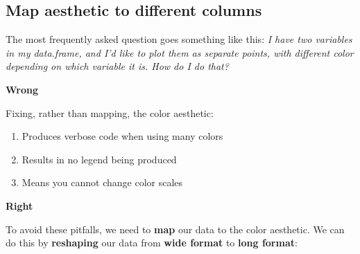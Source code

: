 \documentclass[]{book}
\newenvironment{Shaded}{\begin{snugshade}}{\end{snugshade}}
\newcommand{\DataTypeTok}[1]{\textcolor[rgb]{0.13,0.29,0.53}{#1}}
\newcommand{\KeywordTok}[1]{\textcolor[rgb]{0.13,0.29,0.53}{\textbf{#1}}}
\newcommand{\NormalTok}[1]{#1}
\newcommand{\OperatorTok}[1]{\textcolor[rgb]{0.81,0.36,0.00}{\textbf{#1}}}
\newcommand{\StringTok}[1]{\textcolor[rgb]{0.31,0.60,0.02}{#1}}
\providecommand{\tightlist}{%
  \setlength{\itemsep}{0pt}\setlength{\parskip}{0pt}}
\begin{document}
\hypertarget{map-aesthetic-to-different-columns}{%
\subsection{Map aesthetic to different columns}\label{map-aesthetic-to-different-columns}}

The most frequently asked question goes something like this: \emph{I have two variables in my data.frame, and I'd like to plot them as separate points, with different color depending on which variable it is. How do I do that?}

\textbf{Wrong}

Fixing, rather than mapping, the color aesthetic:

\begin{enumerate}
\def\labelenumi{\arabic{enumi}.}
\tightlist
\item
  Produces verbose code when using many colors
\item
  Results in no legend being produced
\item
  Means you cannot change color scales
\end{enumerate}

\begin{Shaded}
\end{Shaded}

\textbf{Right}

To avoid these pitfalls, we need to \textbf{map} our data to the color aesthetic.
We can do this by \textbf{reshaping} our data from \textbf{wide format} to \textbf{long format}:
\end{document}
